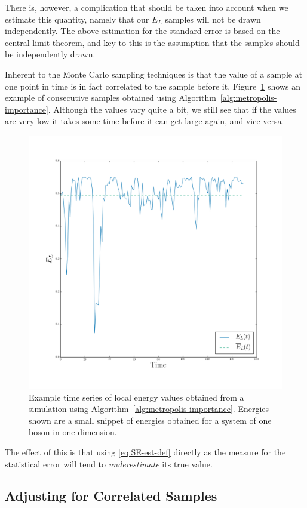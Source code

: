 \documentclass[twocolumn]{article}
\begin{document}
There is, however, a complication that should be taken into account when we
estimate this quantity, namely that our $E_L$ samples will not be drawn
independently. The above estimation for the standard error is based on the
central limit theorem, and key to this is the assumption that the samples should
be independently drawn. 

Inherent to the Monte Carlo sampling techniques is that the value
of a sample at one point in time is in fact correlated to the sample before it.
Figure~\ref{fig:time-series-example} shows an example of consecutive samples
obtained using Algorithm~\ref{alg:metropolis-importance}. Although the values
vary quite a bit, we still see that if the values are very low it takes some
time before it can get large again, and vice versa.

\begin{figure}[ht]
    \centering
    \includegraphics[width=0.8\linewidth]{../results/time-series-example.png}
    \caption{Example time series of local energy values obtained from a
    simulation using Algorithm~\ref{alg:metropolis-importance}. Energies shown
    are a small snippet of energies obtained for a system of one boson in one
    dimension.}
    \label{fig:time-series-example}
\end{figure}

The effect of this is that using \eqref{eq:SE-est-def} directly as the measure for
the statistical error will tend to \textit{underestimate} its true value.

\subsection{Adjusting for Correlated Samples}
\end{document}
